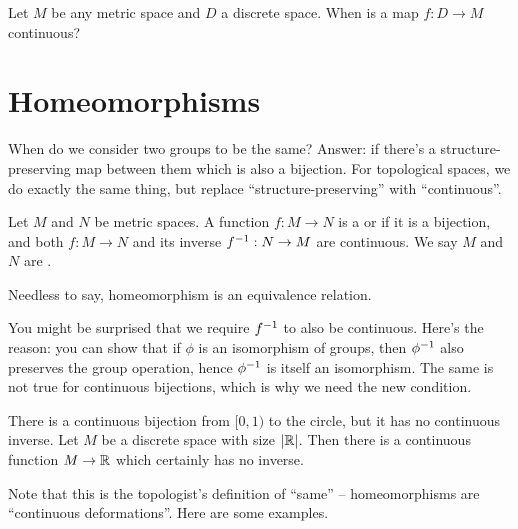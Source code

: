 \begin{ques}
	Let $M$ be any metric space and $D$ a discrete space.
	When is a map $f : D \to M$ continuous?
\end{ques}



\section{Homeomorphisms}
When do we consider two groups to be the same?
Answer: if there's a structure-preserving map between them which is also a bijection.
For topological spaces, we do exactly the same thing, but replace ``structure-preserving'' with ``continuous''.

\begin{definition}
	Let $M$ and $N$ be metric spaces.
	A function $f : M \to N$ is a
	 or  if it is a bijection,
	and both $f : M \to N$ and its inverse $f^{-1} : N \to M$ are continuous.
	We say $M$ and $N$ are .
\end{definition}
Needless to say, homeomorphism is an equivalence relation.

You might be surprised that we require $f^{-1}$ to also be continuous.
Here's the reason: you can show that if $\phi$ is
an isomorphism of groups, then $\phi^{-1}$ also preserves the group operation,
hence $\phi^{-1}$ is itself an isomorphism.
The same is not true for continuous bijections,
which is why we need the new condition.
\begin{example}
	\begin{enumerate}[(a)]
		\ii There is a continuous bijection from $[0,1)$ to the circle,
		but it has no continuous inverse.
		\ii Let $M$ be a discrete space with size $|\mathbb R|$.
		Then there is a continuous function $M \to \mathbb R$
		which certainly has no inverse.
	\end{enumerate}
\end{example}

Note that this is the topologist's definition of ``same'' --
homeomorphisms are ``continuous deformations''.
Here are some examples.

